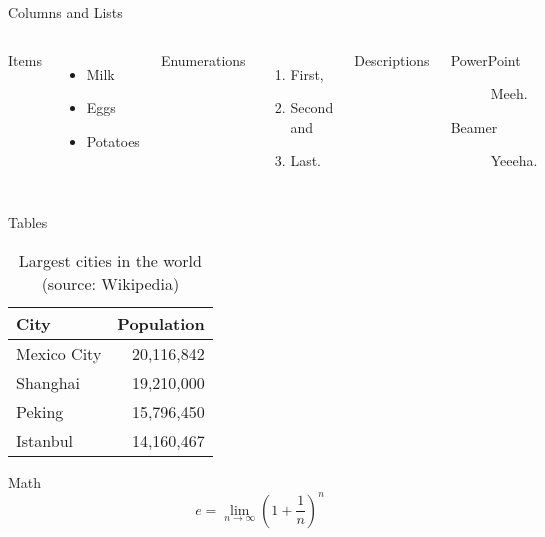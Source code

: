 \begin{frame}{Columns and Lists}
  \begin{columns}[T,onlytextwidth]
      Items
      \begin{itemize}
        \item Milk \item Eggs \item Potatoes
      \end{itemize}

      Enumerations
      \begin{enumerate}
        \item First, \item Second and \item Last.
      \end{enumerate}

      Descriptions
      \begin{description}
        \item[PowerPoint] Meeh. \item[Beamer] Yeeeha.
      \end{description}
  \end{columns}
\end{frame}

\begin{frame}{Tables}
  \begin{table}
    \caption{Largest cities in the world (source: Wikipedia)}
    \begin{tabular}{@{} lr @{}}
      \toprule
      City & Population\\
      \midrule
      Mexico City & 20,116,842\\
      Shanghai & 19,210,000\\
      Peking & 15,796,450\\
      Istanbul & 14,160,467\\
      \bottomrule
    \end{tabular}
  \end{table}
\end{frame}

\begin{frame}{Math}
  \begin{equation*}
    e = \lim_{n\to \infty} \left(1 + \frac{1}{n} \right)^n
  \end{equation*}
\end{frame}

